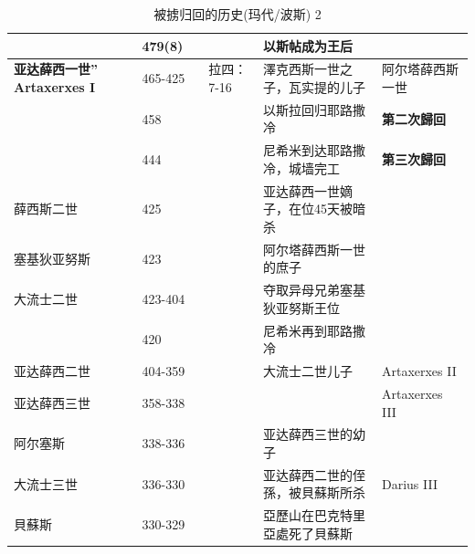 \begin{table}[!hbp]
\begin{tabular}{|p{2.5cm}|p{1.7cm}|p{1.5cm}|p{}|p{2.8cm}|}
&479(8)　& & 以斯帖成为王后&\\\hline
\textbf{亚达薛西一世” Artaxerxes I} &	465-425&拉四：7-16&澤克西斯一世之子，瓦实提的儿子&阿尔塔薛西斯一世\\\hline
&458&&以斯拉回归耶路撒冷	&\textcolor[rgb]{0,.1,1}{\textbf{第二次歸回}}\\\hline
&444&&尼希米到达耶路撒冷，城墙完工	&\textcolor[rgb]{0,.1,1}{\textbf{第三次歸回}}\\\hline
薛西斯二世	&425&&亚达薛西一世嫡子，在位45天被暗杀&\\\hline	
塞基狄亚努斯 	&423&&阿尔塔薛西斯一世的庶子&\\\hline	
大流士二世	&423-404&&夺取异母兄弟塞基狄亚努斯王位&\\\hline
&420&&尼希米再到耶路撒冷	&\\\hline
亚达薛西二世&404-359&&大流士二世儿子&Artaxerxes II\\\hline
亚达薛西三世&358-338&&&Artaxerxes III\\\hline
阿尔塞斯&338-336&&亚达薛西三世的幼子& \\\hline
大流士三世&336-330&&亚达薛西二世的侄孫，被貝蘇斯所杀&Darius III\\\hline
貝蘇斯&330-329&&亞歷山在巴克特里亞處死了貝蘇斯& \\\hline
								
\end{tabular}
\caption{被掳归回的历史(玛代/波斯) 2}
\end{table}

